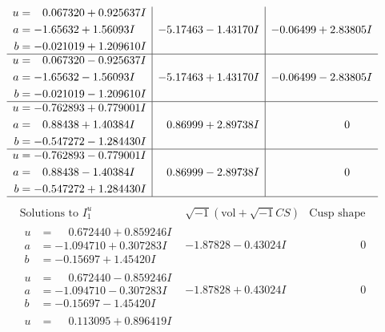 \documentclass[1p]{elsarticle_modified}
\theoremstyle{definition}
\newcommand{\I}{\sqrt{-1}}
\begin{document}
$$\begin{array}{c|c|c}
\begin{aligned}
u &= \phantom{-}0.067320 + 0.925637 I \\
a &= -1.65632 + 1.56093 I \\
b &= -0.021019 + 1.209610 I\end{aligned}
 & -5.17463 - 1.43170 I & -0.06499 + 2.83805 I \\ \hline\begin{aligned}
u &= \phantom{-}0.067320 - 0.925637 I \\
a &= -1.65632 - 1.56093 I \\
b &= -0.021019 - 1.209610 I\end{aligned}
 & -5.17463 + 1.43170 I & -0.06499 - 2.83805 I \\ \hline\begin{aligned}
u &= -0.762893 + 0.779001 I \\
a &= \phantom{-}0.88438 + 1.40384 I \\
b &= -0.547272 - 1.284430 I\end{aligned}
 & \phantom{-}0.86999 + 2.89738 I & \phantom{-0.000000 } 0 \\ \hline\begin{aligned}
u &= -0.762893 - 0.779001 I \\
a &= \phantom{-}0.88438 - 1.40384 I \\
b &= -0.547272 + 1.284430 I\end{aligned}
 & \phantom{-}0.86999 - 2.89738 I & \phantom{-0.000000 } 0\\
 \hline 
 \end{array}$$\newpage$$\begin{array}{c|c|c}  
\text{Solutions to }I^u_{1}& \I (\text{vol} + \sqrt{-1}CS) & \text{Cusp shape}\\
 \hline 
\begin{aligned}
u &= \phantom{-}0.672440 + 0.859246 I \\
a &= -1.094710 + 0.307283 I \\
b &= -0.15697 + 1.45420 I\end{aligned}
 & -1.87828 - 0.43024 I & \phantom{-0.000000 } 0 \\ \hline\begin{aligned}
u &= \phantom{-}0.672440 - 0.859246 I \\
a &= -1.094710 - 0.307283 I \\
b &= -0.15697 - 1.45420 I\end{aligned}
 & -1.87828 + 0.43024 I & \phantom{-0.000000 } 0 \\ \hline\begin{aligned}
u &= \phantom{-}0.113095 + 0.896419 I \\

\end{aligned}
\end{array}$$
\end{document}
